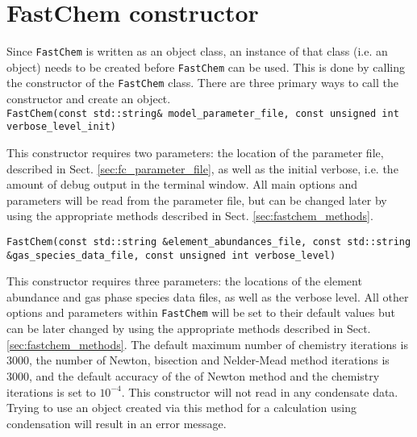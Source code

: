 \documentclass[numbers=noenddot]{aux/fcmanual}
\newcommand{\fc}{\texttt{FastChem}\xspace}
\begin{document}
\section{FastChem constructor}

Since \fc is written as an object class, an instance of that class (i.e. an object) needs to be created before \fc can be used. This is done by calling the constructor of the \fc class. There are three primary ways to call the constructor and create an object.\\

\lstinline!FastChem(const std::string& model_parameter_file, const unsigned int verbose_level_init)!
\begin{addmargin}[25pt]{0pt}
  This constructor requires two parameters: the location of the parameter file, described in Sect. \ref{sec:fc_parameter_file}, as well as the initial verbose, i.e. the amount of debug output in the terminal window. All main options and parameters will be read from the parameter file, but can be changed later by using the appropriate methods described in Sect. \ref{sec:fastchem_methods}.
\end{addmargin}

\bigbreak

\lstinline[breaklines=true]!FastChem(const std::string &element_abundances_file, const std::string &gas_species_data_file, const unsigned int verbose_level)!
\begin{addmargin}[25pt]{0pt}
  This constructor requires three parameters: the locations of the element abundance and gas phase species data files, as well as the verbose level. All other options and parameters within \fc will be set to their default values but can be later changed by using the appropriate methods described in Sect. \ref{sec:fastchem_methods}. The default maximum number of chemistry iterations is 3000, the number of Newton, bisection and Nelder-Mead method iterations is 3000, and the default accuracy of the of Newton method and the chemistry iterations is set to $10^{-4}$. This constructor will not read in any condensate data. Trying to use an object created via this method for a calculation using condensation will result in an error message.
\end{addmargin}

\bigbreak
\end{document}
